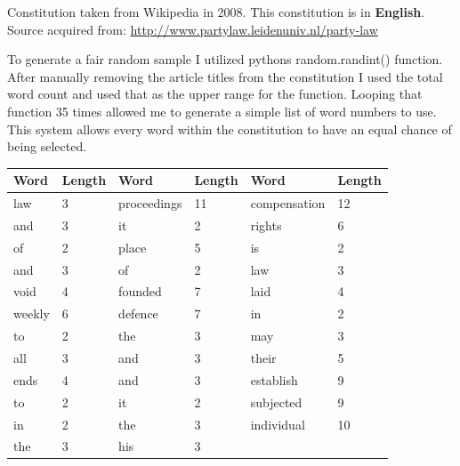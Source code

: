 \documentclass{homework}
\begin{document}
\maketitle


Constitution taken from Wikipedia in 2008. This constitution is in \textbf{English}. \\
Source acquired from: \url{http://www.partylaw.leidenuniv.nl/party-law} 


To generate a fair random sample I utilized pythons random.randint() function. After manually removing the article titles from the constitution I used the total word count and used that as the upper range for the function. Looping that function 35 times allowed me to generate a simple list of word numbers to use. This system allows every word within the constitution to have an equal chance of being selected. 

\begin{table}[h]
\begin{tabular}{ll | ll | ll}
Word   & Length & Word        & Length & Word         & Length \\
\hline \hline
law    & 3      & proceedings & 11     & compensation & 12     \\
and    & 3      & it          & 2      & rights       & 6      \\
of     & 2      & place       & 5      & is           & 2      \\
and    & 3      & of          & 2      & law          & 3      \\
void   & 4      & founded     & 7      & laid         & 4      \\
weekly & 6      & defence     & 7      & in           & 2      \\
to     & 2      & the         & 3      & may          & 3      \\
all    & 3      & and         & 3      & their        & 5      \\
ends   & 4      & and         & 3      & establish    & 9      \\
to     & 2      & it          & 2      & subjected    & 9      \\
in     & 2      & the         & 3      & individual   & 10     \\
the    & 3      & his         & 3      &              &       
\end{tabular}
\end{table}
\end{document}
